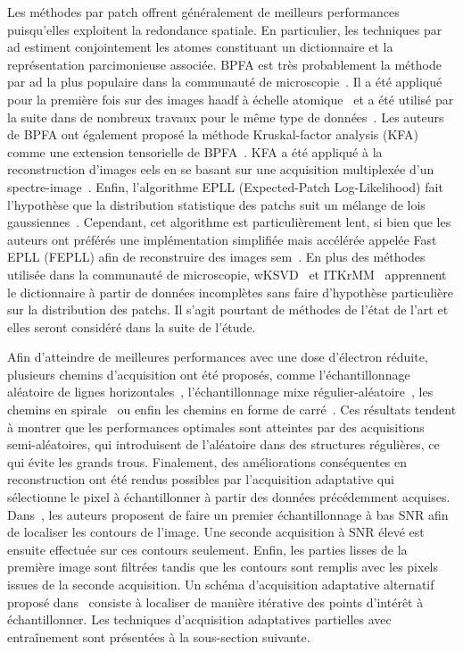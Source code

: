 Les méthodes par patch offrent généralement de meilleurs performances puisqu'elles exploitent la redondance spatiale. En particulier, les techniques par \gls{ad} estiment conjointement les atomes constituant un dictionnaire et la représentation parcimonieuse associée. %
%
BPFA est très probablement la méthode par \gls{ad} la plus populaire dans la communauté de microscopie~\cite{xing2012siam}. Il a été appliqué pour la première fois sur des images \gls{haadf} à échelle atomique~\cite{stevens2013potential} et a été utilisé par la suite dans de nombreux travaux pour le même type de données~\cite{mucke2016practical,kovarik2016implementation}.
%
Les auteurs de BPFA ont également proposé la méthode Kruskal-factor analysis (KFA) comme une extension tensorielle de BPFA~\cite{stevens2017tensor}. KFA a été appliqué à la reconstruction d'images \gls{eels} en se basant sur une acquisition multiplexée d'un spectre-image~\cite{stevens2016mm}.
%
Enfin, l'algorithme EPLL (Expected-Patch Log-Likelihood) fait l'hypothèse que la distribution statistique des patchs suit un mélange de lois gaussiennes~\cite{zoran2011from}. Cependant, cet algorithme est particulièrement lent, si bien que les auteurs ont préférés une implémentation simplifiée mais accélérée appelée Fast EPLL (FEPLL) afin de reconstruire des images \gls{sem}~\cite{parameswaran2019accelerating}.
%
En plus des méthodes utilisée dans la communauté de microscopie, wKSVD~\cite{mairal2008tip} et ITKrMM~\cite{naumova2018fast,naumova2017dictionary} apprennent le dictionnaire à partir de données incomplètes sans faire d'hypothèse particulière sur la distribution des patchs. Il s'agit pourtant de méthodes de l'état de l'art et elles seront considéré dans la suite de l'étude.

Afin d'atteindre de meilleures performances avec une dose d'électron réduite, plusieurs chemins d'acquisition ont été proposés, comme l'échantillonnage aléatoire de lignes horizontales~\cite{kovarik2016implementation,han2018optimal}, l'échantillonnage mixe régulier-aléatoire~\cite{stevens2018apl}, les chemins en spirale~\cite{sang2017dynamic,li2018compressive,han2018optimal} ou enfin les chemins en forme de carré~\cite{han2018optimal}.
%
Ces résultats tendent à montrer que les performances optimales sont atteintes par des acquisitions semi-aléatoires, qui introduisent de l'aléatoire dans des structures régulières, ce qui évite les grands trous. %
%
Finalement, des améliorations conséquentes en reconstruction ont été rendus possibles par l'acquisition adaptative qui sélectionne le pixel à échantillonner à partir des données précédemment acquises. Dans~\cite{dahmen2016feature}, les auteurs proposent de faire un premier échantillonnage à bas SNR afin de localiser les contours de l'image. Une seconde acquisition à SNR élevé est ensuite effectuée sur ces contours seulement. Enfin, les parties lisses de la première image sont filtrées tandis que les contours sont remplis avec les pixels issues de la seconde acquisition. Un schéma d'acquisition adaptative alternatif proposé dans~\cite{dahmen2019adaptive} consiste à localiser de manière itérative des points d'intérêt à échantillonner. Les techniques d'acquisition adaptatives partielles avec entraînement sont présentées à la sous-section suivante.

